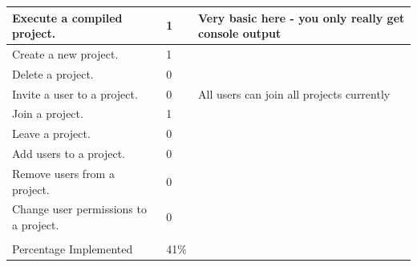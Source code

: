 \documentclass[twoside,letterpaper]{article}
\begin{document}
\begin{tabular}{|p{6cm}|p{2.5cm}|p{8cm}|}
Execute a compiled project.                                                            & 1                     & Very basic here - you only really get console output                                                                     \\ \hline
Create a new project.                                                                  & 1                     &                                                                                                                          \\ \hline
Delete a project.                                                                      & 0                     &                                                                                                                          \\ \hline
Invite a user to a project.                                                            & 0                     & All users can join all projects currently                                                                                \\ \hline
Join a project.                                                                        & 1                     &                                                                                                                          \\ \hline
Leave a project.                                                                       & 0                     &                                                                                                                          \\ \hline
Add users to a project.                                                                & 0                     &                                                                                                                          \\ \hline
Remove users from a project.                                                           & 0                     &                                                                                                                          \\ \hline
Change user permissions to a project.                                                  & 0                     &                                                                                                                          \\ \hline
                                                                                       &                       &                                                                                                                          \\ \hline
Percentage Implemented                                                                 & 41\%                  &                                                                                                                          \\ \hline
\end{tabular}
\end{document}
